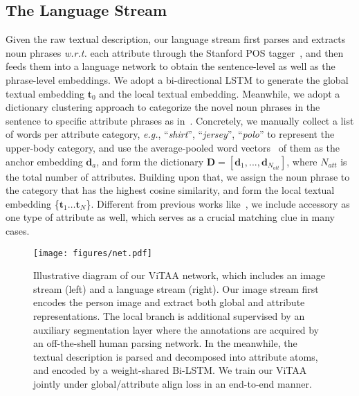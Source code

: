 \documentclass[runningheads]{llncs}
\begin{document}
\subsection{The Language Stream}
Given the raw textual description, our language stream first parses and extracts noun phrases \textit{w.r.t.} each attribute through the Stanford POS tagger~\cite{manning-EtAl:2014:P14-5}, and then feeds them into a language network to obtain the sentence-level as well as the phrase-level embeddings. We adopt a bi-directional LSTM to generate the global textual embedding $\boldsymbol{t}_0$ and the local textual embedding. 
Meanwhile, we adopt a dictionary clustering approach to categorize the novel noun phrases in the sentence to specific attribute phrases as in~\cite{Fang_2019_CVPR}.
Concretely, we manually collect a list of words per attribute category, \textit{e.g.}, ``\textit{shirt}'', ``\textit{jersey}'', ``\textit{polo}'' to represent the upper-body category, and use the average-pooled word vectors~\cite{goldberg2014word2vec} of them as the anchor embedding $\mathbf{d}_a$, and form the dictionary $\mathbf{D} = [\mathbf{d}_1, ... ,\mathbf{d}_{N_{att}}]$, where $N_{att}$ is the total number of attributes. Building upon that, we assign the noun phrase to the category that has the highest cosine similarity, and form the local textual embedding \{$\boldsymbol{t}_1\dots\boldsymbol{t}_N$\}. Different from previous works like~\cite{zhang2019densely,niu2019improving}, we include accessory as one type of attribute as well, which serves as a crucial matching clue in many cases. 



\begin{figure*}[t!]
\centering
\texttt{[image: figures/net.pdf]}
\caption{Illustrative diagram of our ViTAA network, which includes an image stream (left) and a language stream (right). Our image stream first encodes the person image and extract both global and attribute representations. The local branch is additional supervised by an auxiliary segmentation layer where the annotations are acquired by an off-the-shell human parsing network. 
In the meanwhile, the textual description is parsed and decomposed into attribute atoms, and encoded by a weight-shared Bi-LSTM. We train our ViTAA jointly under global/attribute align loss in an end-to-end manner.}
\label{fig:architecture}
\end{figure*}
\end{document}
